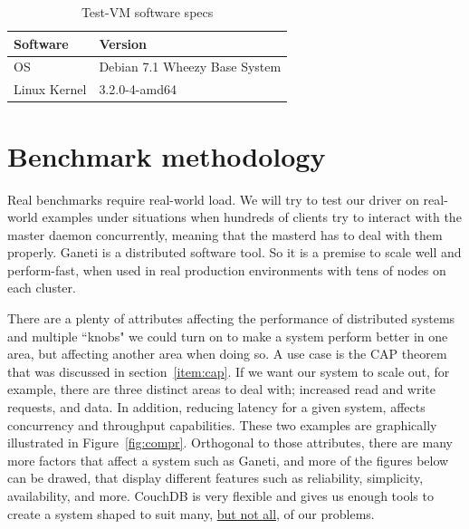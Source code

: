 \begin{table}[htbp]
  \centering
  \begin{tabular}{ | l | l | }
    \hline
    Software & Version \\ \hline \hline
    OS & Debian 7.1 Wheezy Base System \\
    \hline
    Linux Kernel & 3.2.0-4-amd64  \\
    \hline
  \end{tabular}
  \caption{Test-VM software specs}
  \label{tab:soft-specs}
\end{table}

\section{Benchmark methodology}\label{sec:bench}

Real benchmarks require real-world load. We will try to test our driver on
real-world examples under situations when hundreds of clients try to interact
with the master daemon concurrently, meaning that the masterd has to deal with
them properly. Ganeti is a distributed software tool. So it is a premise to
scale well and perform-fast, when used in real production environments with tens
of nodes on each cluster.

There are a plenty of attributes affecting the performance of distributed
systems and multiple ``knobs" we could turn on to make a system perform better
in one area, but affecting another area when doing so. A use case is the CAP
theorem that was discussed in section~\ref{item:cap}. If we want our system to
scale out, for example, there are three distinct areas to deal with; increased
read and write requests, and data. In addition, reducing latency for a given
system, affects concurrency and throughput capabilities. These two examples are
graphically illustrated in Figure~\ref{fig:compr}.
Orthogonal to those attributes, there are many more factors that affect a system
such as Ganeti, and more of the figures below can be drawed, that display
different features such as reliability, simplicity, availability, and more.
CouchDB is very flexible and gives us enough tools to create a system shaped to
suit many, \underline{but not all}, of our problems.

